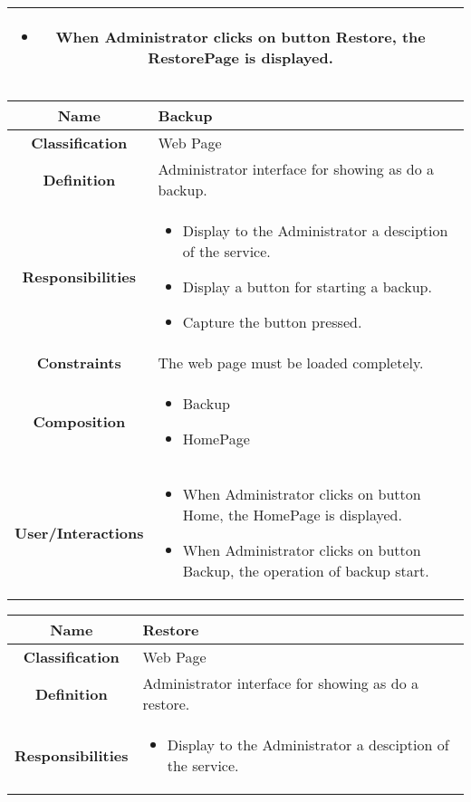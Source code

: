 \documentclass[11pt, a4paper,titlepage]{article}
\begin{document}
\begin{enumerate}
\begin{tabularx}{\textwidth}{| c | X |}
\begin{itemize}
		\item When Administrator clicks on button Restore, the RestorePage is displayed.
	\end{itemize}
	\\
	\hline 
\end{tabularx}
\begin{tabularx}{\textwidth}{| c | X |}
	\hline
	\textbf{Name} &
	Backup
	\\
	\hline
	\textbf{Classification} &
	Web Page
	\\
	\hline
	\textbf{Definition} &
	Administrator interface for showing as do a backup.\\
	\hline
	\textbf{Responsibilities} &
	\begin{itemize}
		\item Display to the Administrator a desciption of the service.
		\item Display a button for starting a backup.
		\item Capture the button pressed.
	\end{itemize}
	\\
	\hline
	\textbf{Constraints} & The web page must be loaded completely.
	\\
	\hline
	\textbf{Composition} &
	\begin{itemize}
		\item Backup
		\item HomePage
	\end{itemize}
	\\
	\hline
	\textbf{User/Interactions} &
	\begin{itemize}
		\item When Administrator clicks on button Home, the HomePage is displayed.
		\item When Administrator clicks on button Backup, the operation of backup start.
	\end{itemize}
	\\
	\hline 
\end{tabularx}
\begin{tabularx}{\textwidth}{| c | X |}
	\hline
	\textbf{Name} &
	Restore
	\\
	\hline
	\textbf{Classification} &
	Web Page
	\\
	\hline
	\textbf{Definition} &
	Administrator interface for showing as do a restore.\\
	\hline
	\textbf{Responsibilities} &
	\begin{itemize}
		\item Display to the Administrator a desciption of the service.

\end{itemize}
\end{tabularx}
\end{enumerate}
\end{document}

